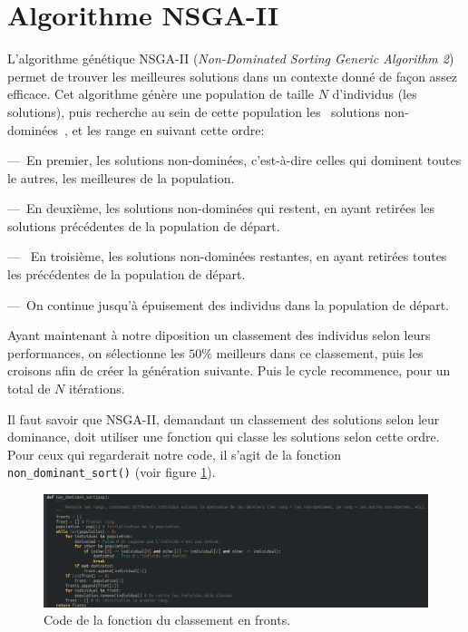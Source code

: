 \documentclass[11pt, a4paper, oneside, portrait]{report}
\begin{document}
    \section*{Algorithme NSGA-II}
        L'algorithme génétique NSGA-II (\emph{Non-Dominated Sorting Generic Algorithm 2}) permet de trouver les meilleures solutions dans un contexte donné de façon assez efficace.
        Cet algorithme génère une population de taille $N$ d'individus (les solutions), puis recherche au sein de cette population les \guillemotleft{}~solutions non-dominées~\guillemotright{}, et les range en suivant cette ordre:

        ---~En premier, les solutions non-dominées, c'est-à-dire celles qui dominent toutes le autres, les meilleures de la population.

        ---~En deuxième, les solutions non-dominées qui restent, en ayant retirées les solutions précédentes de la population de départ.

        ---~ En troisième, les solutions non-dominées restantes, en ayant retirées toutes les précédentes de la population de départ.

        ---~On continue jusqu'à épuisement des individus dans la population de départ.

        Ayant maintenant à notre diposition un classement des individus selon leurs performances, on sélectionne les $50\%{}$ meilleurs dans ce classement, puis les croisons afin de créer la génération suivante.
        Puis le cycle recommence, pour un total de $N$ itérations.

        Il faut savoir que NSGA-II, demandant un classement des solutions selon leur dominance, doit utiliser une fonction qui classe les solutions selon cette ordre. Pour ceux qui regarderait notre code, il s'agit de la fonction \texttt{non\_dominant\_sort()} (voir figure \ref{fig:non_dominant_sort}).

        \begin{figure}[H]
            \centering
            \includegraphics[width=\textwidth]{Figures/non_dominant_sort.png}
            \caption{Code de la fonction du classement en fronts.}
            \label{fig:non_dominant_sort}
        \end{figure}
\end{document}
